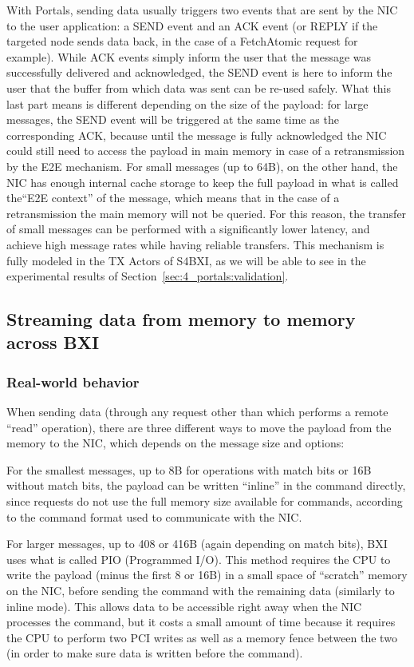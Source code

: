 With Portals, sending data usually triggers two events that are sent by the NIC
to the user application: a SEND event and an ACK event (or REPLY if the targeted
node sends data back, in the case of a FetchAtomic request for example). While
ACK events simply inform the user that the message was successfully delivered
and acknowledged, the SEND event is here to inform the user that the buffer from
which data was sent can be re-used safely. What this last part means is
different depending on the size of the payload: for large messages, the SEND
event will be triggered at the same time as the corresponding ACK, because until
the message is fully acknowledged the NIC could still need to access the payload
in main memory in case of a retransmission by the E2E mechanism. For small
messages (up to 64B), on the other hand, the NIC has enough internal cache
storage to keep the full payload in what is called the``E2E context'' of the
message, which means that in the case of a retransmission the main memory will
not be queried. For this reason, the transfer of small messages can be performed
with a significantly lower latency, and achieve high message rates while having
reliable transfers. This mechanism is fully modeled in the TX Actors of S4BXI,
as we will be able to see in the experimental results of
Section~\ref{sec:4_portals:validation}.

\subsection{Streaming data from memory to memory across BXI}

\subsubsection{Real-world behavior}

When sending data (through any request other than  which
performs a remote ``read'' operation), there are three different ways to move
the payload from the memory to the NIC, which depends on the message size and
options:

For the smallest messages, up to 8B for operations with match bits or 16B
without match bits, the payload can be written ``inline'' in the command
directly, since requests do not use the full memory size available for commands,
according to the command format used to communicate with the NIC.

For larger messages, up to 408 or 416B (again depending on match bits), BXI uses
what is called PIO (Programmed I/O). This method requires the CPU to write the
payload (minus the first 8 or 16B) in a small space of ``scratch'' memory on the
NIC, before sending the command with the remaining data (similarly to inline
mode). This allows data to be accessible right away when the NIC processes the
command, but it costs a small amount of time because it requires the CPU to
perform two PCI writes as well as a memory fence between the two (in order to
make sure data is written before the command).

